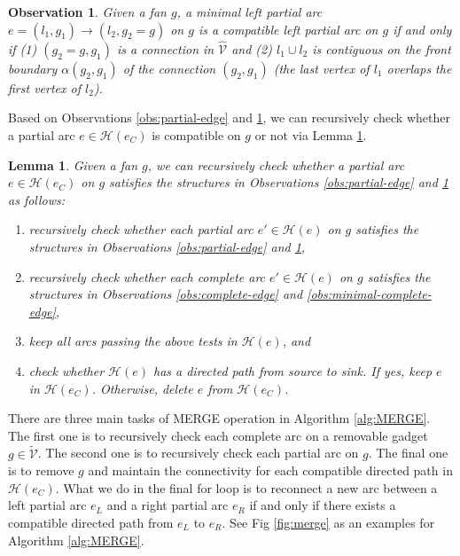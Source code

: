 \documentclass[11pt]{article}
\newcommand{\HH}{\mathcal{H}}
\newcommand{\VV}{\mathcal{V}}
\newtheorem{lemma}[figure]{Lemma}
\newtheorem{observation}[figure]{Observation}
\begin{document}
\begin{observation}\label{obs:minimal-partial-edge}
Given a fan $g$,
a minimal left partial arc $e=(l_1, g_1)\rightarrow (l_2, g_2=g)$ on $g$
is a compatible left partial arc on $g$ if and only if
(1) $(g_2=g, g_1)$ is a connection in $\hat{\VV}$ and
(2) $l_1\cup l_2$ is contiguous on the front boundary $\alpha(g_2, g_1)$ of the connection $(g_2, g_1)$
(the last vertex of $l_1$ overlaps the first vertex of $l_2$).
\end{observation}


Based on Observations \ref{obs:partial-edge} and \ref{obs:minimal-partial-edge},
we can recursively check whether a partial arc $e \in \HH(e_C)$
is compatible on $g$ or not via Lemma \ref{lemma:partial-edge}.

\begin{lemma}\label{lemma:partial-edge}
Given a fan $g$,
we can recursively check whether a partial arc $e\in \HH(e_C)$ on $g$
satisfies the structures in Observations \ref{obs:partial-edge} and \ref{obs:minimal-partial-edge} as follows:
\begin{enumerate}
\item recursively check whether
each partial arc $e'\in \HH(e)$ on $g$
satisfies the structures in Observations \ref{obs:partial-edge} and \ref{obs:minimal-partial-edge},
\item recursively check whether
each complete arc $e'\in \HH(e)$ on $g$ satisfies the structures
in Observations \ref{obs:complete-edge} and \ref{obs:minimal-complete-edge},
\item keep all arcs passing the above tests in $\HH(e)$, and
\item check whether $\HH(e)$ has a directed path from source to sink. If yes, keep $e$ in $\HH(e_C)$.
Otherwise, delete $e$ from $\HH(e_C)$.
\end{enumerate}
\end{lemma}

There are three main tasks of MERGE operation in Algorithm \ref{alg:MERGE}.
The first one is to recursively check each complete arc on a removable gadget $g\in \tilde{\VV}$.
The second one is to recursively check each partial arc on $g$.
The final one is to remove $g$ and maintain the connectivity
for each compatible directed path
in $\HH(e_C)$.
What we do in the final for loop is to
reconnect a new arc between a left partial arc $e_L$ and a right partial arc $e_R$
if and only if there exists a compatible directed path from $e_L$ to $e_R$.
See Fig \ref{fig:merge} as an examples for Algorithm \ref{alg:MERGE}.
\end{document}
